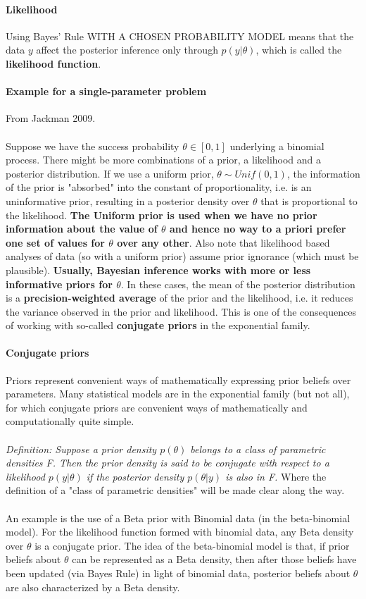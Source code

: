 \documentclass {article}
\begin{document}
\paragraph{Likelihood}
Using Bayes' Rule WITH A CHOSEN PROBABILITY MODEL means that the data $y$ affect the posterior inference only through $p(y | \theta)$, which is called the \textbf{likelihood function}. 

\paragraph {Example for a single-parameter problem}
From Jackman 2009.
\\
\\
Suppose we have the success probability $\theta \in [0,1]$ underlying a binomial process. There might be more combinations of a prior, a likelihood and a posterior distribution.
If we use a uniform prior, $\theta \sim Unif(0,1)$, the information of the prior is "absorbed" into the constant of proportionality, i.e. is an uninformative prior, resulting in a posterior density over $\theta$ that is proportional to the likelihood.      
\textbf{The Uniform prior is used when we have no prior information about the value of $\theta$ and hence no way to a priori prefer one set of values for $\theta$ over any other}.
Also note that likelihood based analyses of data (so with a uniform prior) assume prior ignorance (which must be plausible). 
\textbf{Usually, Bayesian inference works with more or less informative priors for $\theta$}.
In these cases, the mean of the posterior distribution is a \textbf{precision-weighted average} of the prior and the likelihood, i.e. it reduces the variance observed in the prior and likelihood.  
This is one of the consequences of working with so-called \textbf{conjugate priors} in the exponential family. 

\paragraph{Conjugate priors}
Priors represent convenient ways of mathematically expressing prior beliefs over parameters.
 Many statistical models are in the exponential family (but not all), for which conjugate priors are convenient ways of mathematically and computationally quite simple.
\\
\\
\textit{Definition: Suppose a prior density $p(\theta)$ belongs to a class of parametric densities F.
Then the prior density is said to be conjugate with respect to a likelihood $p(y|\theta)$ if the posterior density $p(\theta | y)$ is also in F.}  
Where the definition of a "class of parametric densities" will be made clear along the way.
\\
\\
An example is the use of a Beta prior with Binomial data (in the beta-binomial model).
 For the likelihood function formed with binomial data, any Beta density over $\theta$ is a conjugate prior.
 The idea of the beta-binomial model is that, if prior beliefs about $\theta$ can be represented as a Beta density, then after those beliefs have been updated (via Bayes Rule) in light of binomial data, posterior beliefs about $\theta$ are also characterized by a Beta density.  
 
\end{document}
